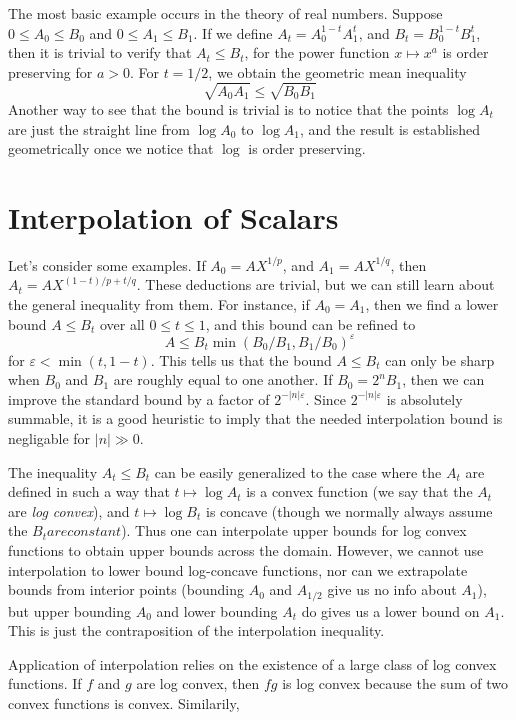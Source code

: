 The most basic example occurs in the theory of real numbers. Suppose $0 \leq A_0 \leq B_0$ and $0 \leq A_1 \leq B_1$. If we define $A_t = A_0^{1-t}A_1^t$, and $B_t = B_0^{1-t}B_1^t$, then it is trivial to verify that $A_t \leq B_t$, for the power function $x \mapsto x^a$ is order preserving for $a > 0$. For $t = 1/2$, we obtain the geometric mean inequality
%
\[ \sqrt{A_0 A_1} \leq \sqrt{B_0 B_1} \]
%
Another way to see that the bound is trivial is to notice that the points $\log A_t$ are just the straight line from $\log A_0$ to $\log A_1$, and the result is established geometrically once we notice that $\log$ is order preserving.

\section{Interpolation of Scalars}

Let's consider some examples. If $A_0 = AX^{1/p}$, and $A_1 = AX^{1/q}$, then $A_t = AX^{(1-t)/p + t/q}$. These deductions are trivial, but we can still learn about the general inequality from them. For instance, if $A_0 = A_1$, then we find a lower bound $A \leq B_t$ over all $0 \leq t \leq 1$, and this bound can be refined to
%
\[ A \leq B_t \min(B_0/B_1,B_1/B_0)^\varepsilon \]
%
for $\varepsilon < \min(t, 1-t)$. This tells us that the bound $A \leq B_t$ can only be sharp when $B_0$ and $B_1$ are roughly equal to one another. If $B_0 = 2^n B_1$, then we can improve the standard bound by a factor of $2^{-|n| \varepsilon}$. Since $2^{-|n| \varepsilon}$ is absolutely summable, it is a good heuristic to imply that the needed interpolation bound is negligable for $|n| \gg 0$.

The inequality $A_t \leq B_t$ can be easily generalized to the case where the $A_t$ are defined in such a way that $t \mapsto \log A_t$ is a convex function (we say that the $A_t$ are {\it log convex}), and $t \mapsto \log B_t$ is concave (though we normally always assume the $B_t are constant$). Thus one can interpolate upper bounds for log convex functions to obtain upper bounds across the domain. However, we cannot use interpolation to lower bound log-concave functions, nor can we extrapolate bounds from interior points (bounding $A_0$ and $A_{1/2}$ give us no info about $A_1$), but upper bounding $A_0$ and lower bounding $A_t$ do gives us a lower bound on $A_1$. This is just the contraposition of the interpolation inequality.

Application of interpolation relies on the existence of a large class of log convex functions. If $f$ and $g$ are log convex, then $fg$ is log convex because the sum of two convex functions is convex. Similarily, 

